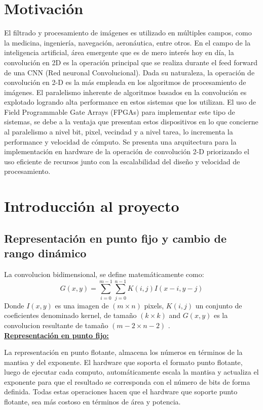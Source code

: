 \documentclass[a4paper]{article}
\begin{document}
\section*{Motivación}  \label{motiv_sec}
El filtrado y procesamiento de imágenes es utilizado en múltiples campos, como la medicina, ingeniería, navegación, aeronáutica, entre otros. En el campo de la inteligencia artificial, área emergente que es de mero interés hoy en día, la convolución en 2D es la operación principal que se realiza durante el feed forward de una CNN (Red neuronal Convolucional). 
Dada su naturaleza, la operación de convolución en 2-D es la más empleada en los algoritmos de procesamiento de imágenes. El paralelismo inherente de algoritmos basados en la convolución es explotado logrando alta performance en estos sistemas que los utilizan.
El uso de Field Programmable Gate Arrays (FPGAs) para implementar este tipo de sistemas, se debe a la ventaja que presentan estos dispositivos en lo que concierne al paralelismo a nivel bit, pixel, vecindad y a nivel tarea, lo incrementa la performance y velocidad de cómputo.
Se presenta una arquitectura para la implementación en hardware de la operación de convolución 2-D priorizando el uso eficiente de recursos junto con la escalabilidad del diseño y velocidad de procesamiento.



\section{Introducción al proyecto} \label{intro_secc}
\subsection{Representación en punto fijo y cambio de rango dinámico }\label{fixedpoint}
La convolucion bidimensional, se define matemáticamente como:
\begin{equation}\label{conv-org}
  G(x,y) = \sum_{i=0}^{m-1} \sum_{j=0}^{n-1}K(i,j)I(x-i,y-j)
\end{equation}
Donde $I(x,y)$ es una imagen de $(m \times n)$ pixels, $K(i,j)$ un conjunto de coeficientes denominado kernel, de tamaño
$(k \times k)$ and $G(x,y)$ es la convolucion resultante de tamaño  $(m-2 \times n-2)$ .\\

\underline{\textbf{Representación en punto fijo:}}

La representaci\'on en punto flotante, almacena los n\'umeros en t\'erminos de la mantisa y
del exponente. El hardware que soporta el formato punto flotante, luego de ejecutar cada
computo, automáticamente escala la mantisa y actualiza el exponente para que el resultado
se corresponda con el n\'umero de bits de forma definida. Todas estas operaciones hacen que
el hardware que soporte punto flotante, sea m\'as costoso en t\'erminos de \'area y potencia.
\end{document}

